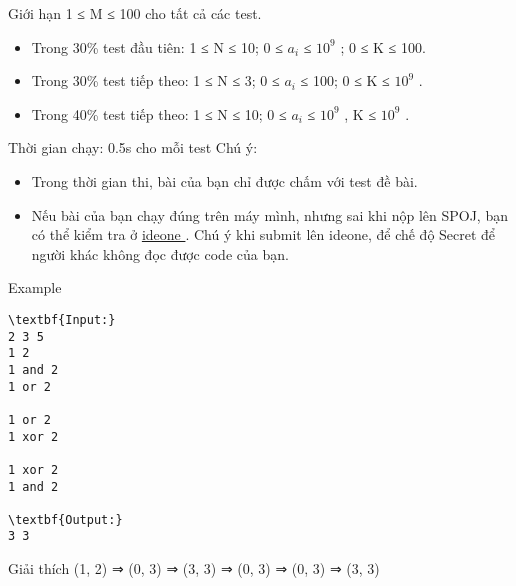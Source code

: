 Giới hạn
1 ≤ M ≤ 100 cho tất cả các test.  
\begin{itemize}
	\item      Trong 30\% test đầu tiên: 1 ≤ N ≤ 10; 0 ≤ $a_{i}$     ≤ $10^{9}$     ; 0 ≤ K ≤ 100.    
	\item      Trong 30\% test tiếp theo: 1 ≤ N ≤ 3; 0 ≤ $a_{i}$     ≤ 100; 0 ≤ K ≤ $10^{9}$     .    
	\item      Trong 40\% test tiếp theo: 1 ≤ N ≤ 10; 0 ≤ $a_{i}$      ≤ $10^{9}$     , K ≤ $10^{9}$     .    
\end{itemize}

   Thời gian chạy: 0.5s cho mỗi test
Chú ý:
\begin{itemize}
	\item     Trong thời gian thi, bài của bạn chỉ được chấm với test đề bài.   
	\item     Nếu bài của bạn chạy đúng trên máy mình, nhưng sai khi nộp lên SPOJ, bạn có thể kiểm tra ở    \href{https://ideone.com}{     ideone    }    . Chú ý khi submit lên ideone, để chế độ Secret để người khác không đọc được code của bạn.   
\end{itemize}
Example
\begin{verbatim}
\textbf{Input:}
2 3 5
1 2
1 and 2
1 or 2

1 or 2
1 xor 2

1 xor 2
1 and 2 

\textbf{Output:}
3 3
\end{verbatim}
Giải thích
(1, 2) ⇒ (0, 3) ⇒ (3, 3) ⇒ (0, 3) ⇒ (0, 3) ⇒ (3, 3)